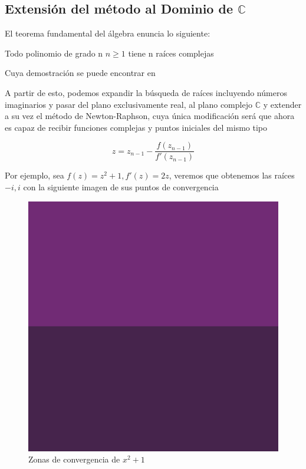 \subsection{Extensión del método al Dominio de $\mathbb{C}$}

El teorema fundamental del álgebra enuncia lo siguiente:

\begin{theorem}
 Todo polinomio de grado n $n \geq 1$ tiene n raíces complejas
\end{theorem}

Cuya demostración se puede encontrar en \cite{lankham}

A partir de esto, podemos expandir la búsqueda de raíces incluyendo números imaginarios y pasar del plano exclusivamente real, al plano complejo  $\mathbb{C}$ y extender a su vez el método de Newton-Raphson, cuya única modificación será que ahora es capaz de recibir funciones complejas y puntos iniciales del mismo tipo

\begin{equation}
     z = z_{n-1} - \frac{f(z_{n-1})}{f'(z_{n-1})}
\end{equation}

Por ejemplo, sea $f(z) = z^2+1, f'(z) = 2z$, veremos que obtenemos las  raíces $-i,i$ con la siguiente imagen de sus puntos de convergencia
\begin{figure}[H]
    \centering
    \includegraphics{images/eq3-1.png}
    \caption{ Zonas de convergencia de $ x^2+1$}
    \label{fig:eq_cuad_compleja_1}
\end{figure}

